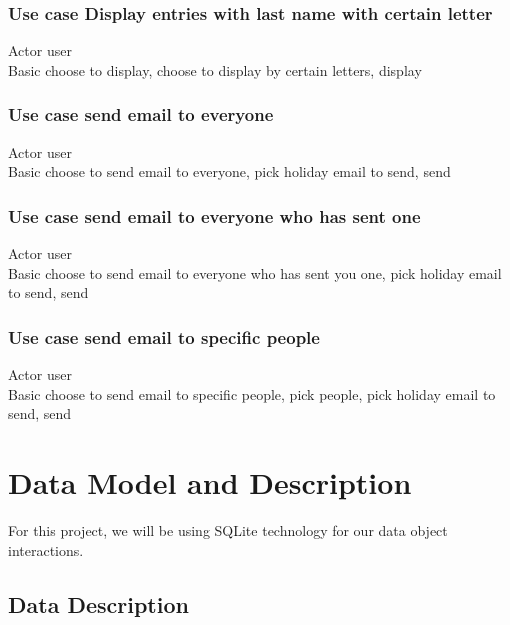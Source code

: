 \documentclass{article}
\begin{document}
\subsubsection*{Use case Display entries with last name with certain letter}
Actor user \\
Basic choose to display, choose to display by certain letters, display \\
 
\subsubsection*{Use case send email to everyone}
Actor user \\
Basic choose to send email to everyone, pick holiday email to send, send \\
 
\subsubsection*{Use case send email to everyone who has sent one}
Actor user \\
Basic choose to send email to everyone who has sent you one, pick holiday email to send, send \\
 
\subsubsection*{Use case send email to specific people}
Actor user \\
Basic choose to send email to specific people, pick people, pick holiday email to send, send \\


\section{Data Model and Description}
For this project, we will be using SQLite technology for our data object interactions.

\subsection{Data Description}
\end{document}
